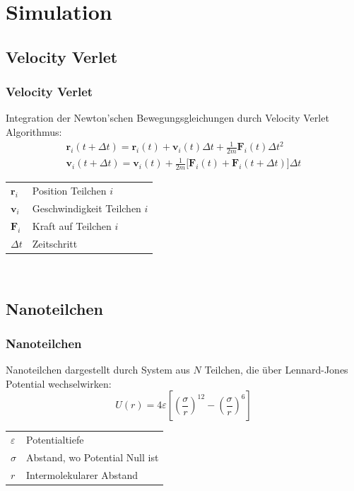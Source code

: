 \documentclass[handout]{beamer}
\begin{document}
\section{Simulation}

\subsection{Velocity Verlet}
\begin{frame}
\frametitle{Velocity Verlet}
Integration der Newton'schen Bewegungsgleichungen durch Velocity Verlet Algorithmus:
\begin{equation}
    \label{eq:velocityverlet}
    \begin{aligned}
        \mathbf{r}_i(t+\Delta t) = \mathbf{r}_i(t) + {\mathbf{v}}_i(t) \Delta t + \frac1{2m} {\mathbf{F}}_i(t) \Delta t^2\\
        \mathbf{v}_i(t+\Delta t) = \mathbf{v}_i(t) + \frac1{2m} \Big[\mathbf{F}_i(t) + \mathbf{F}_i(t+\Delta t)\Big] \Delta t
    \end{aligned}
\end{equation}
\begin{tabular}{l l}
$\mathbf{r}_i$ & Position Teilchen $i$\\
$\mathbf{v}_i$ & Geschwindigkeit Teilchen $i$\\
$\mathbf{F}_i$ & Kraft auf Teilchen $i$\\
$\Delta t$ & Zeitschritt\\
\end{tabular}\\
\end{frame}

\subsection{Nanoteilchen}

\begin{frame}
\frametitle{Nanoteilchen}
Nanoteilchen dargestellt durch System aus $N$ Teilchen, die über Lennard-Jones Potential wechselwirken:
\begin{equation}
    \label{eq:lj}
    U(r) = 4\varepsilon\left[\left(\frac\sigma r\right)^{12} - \left(\frac\sigma r\right)^6\right]
\end{equation}
\begin{tabular}{l l}
$\varepsilon$ & Potentialtiefe\\
$\sigma$ & Abstand, wo Potential Null ist\\
$r$ & Intermolekularer Abstand\\
\end{tabular}\\
\end{frame}
\end{document}
